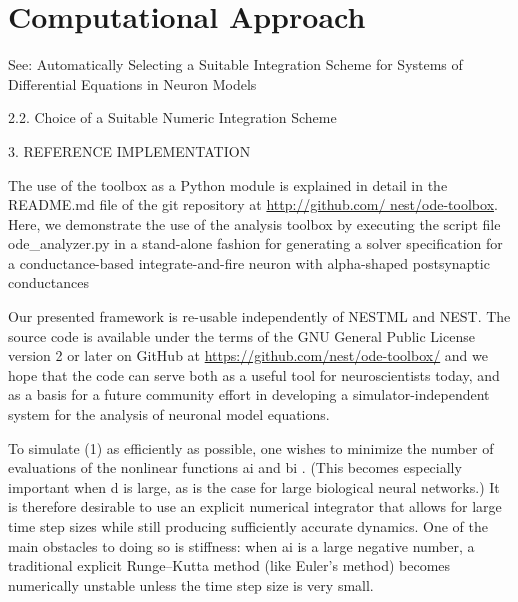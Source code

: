 \chapter{Computational Approach}\label{chap:computational}

See: Automatically Selecting a Suitable Integration Scheme for Systems of Differential Equations in Neuron Models

2.2. Choice of a Suitable Numeric Integration Scheme

3. REFERENCE IMPLEMENTATION

The use of the toolbox as a Python module is explained in detail in the README.md file of the git repository at \url{http://github.com/ nest/ode-toolbox}. Here, we demonstrate the use of the analysis toolbox by executing the script file ode\_analyzer.py in a stand-alone fashion for generating a solver specification for a conductance-based integrate-and-fire neuron with alpha-shaped postsynaptic conductances


Our presented framework is re-usable independently of NESTML and NEST. The source code is available under the terms of the GNU General Public License version 2 or later on GitHub at \url{https://github.com/nest/ode-toolbox/} and we hope that the code can serve both as a useful tool for neuroscientists today, and as a basis for a future community effort in developing a simulator-independent system for the analysis of neuronal model equations.


To simulate (1) as efficiently as possible, one wishes to minimize the number of evaluations
of the nonlinear functions ai and bi
. (This becomes especially important when d is large,
as is the case for large biological neural networks.) It is therefore desirable to use an
explicit numerical integrator that allows for large time step sizes while still producing
sufficiently accurate dynamics. One of the main obstacles to doing so is stiffness: when ai
is
a large negative number, a traditional explicit Runge–Kutta method (like Euler’s method)
becomes numerically unstable unless the time step size is very small. 


